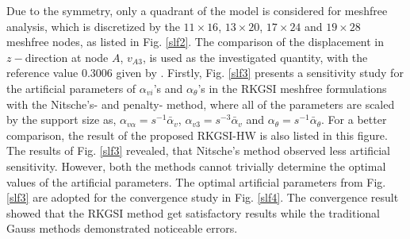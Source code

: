 Due to the symmetry, only a quadrant of the model is considered for meshfree analysis, which is discretized by the $11\times 16$, $13\times 20$, $17\times 24$ and $19\times28$ meshfree nodes, as listed in Fig. \ref{slf2}. The comparison of the displacement in $z-$direction at node $A$, $v_{A3}$, is used as the investigated quantity, with the reference value 0.3006 given by \cite{kiendl2009}. Firstly, Fig. \ref{slf3} presents a sensitivity study for the artificial parameters of $\alpha_{vi}$'s and $\alpha_\theta$'s in the RKGSI meshfree formulations with the Nitsche's- and penalty- method, where all of the parameters are scaled by the support size as, $\alpha_{v\alpha} = s^{-1}\bar \alpha_v$, $\alpha_{v3} = s^{-3} \bar \alpha_v$ and $\alpha_\theta = s^{-1}\bar \alpha_\theta$. For a better comparison, the result of the proposed RKGSI-HW is also listed in this figure. The results of Fig. \ref{slf3} revealed, that Nitsche's method observed less artificial sensitivity. However, both the methods cannot trivially determine the optimal values of the artificial parameters. The optimal artificial parameters from Fig. \ref{slf3} are adopted for the convergence study in Fig. \ref{slf4}. The convergence result showed that the RKGSI method get satisfactory results while the traditional Gauss methods demonstrated noticeable errors.

